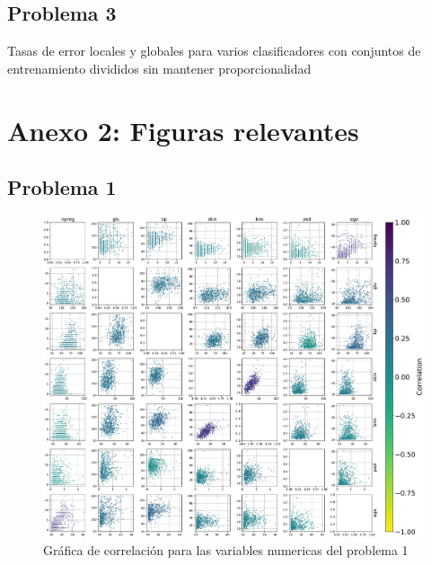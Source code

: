 \documentclass[11pt]{article}
\begin{document}
\subsection*{Problema 3}

\begin{table}[H]
    \caption{Tasas de error locales y globales para varios clasificadores con conjuntos de entrenamiento divididos sin mantener proporcionalidad}
    \label{3-eq-tab}
\end{table}
\section*{Anexo 2: Figuras relevantes}
\subsection*{Problema 1}
\begin{figure}[H]
    \centering
    \includegraphics[width = 1.0\textwidth]{1-correlation.pdf}
    \caption{Gráfica de correlación para las variables numericas del problema 1}
    \label{1-correlation}
\end{figure}
\end{document}
